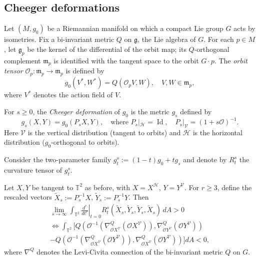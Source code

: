 \documentclass[graybox]{svmult}
\begin{document}
\subsection{Cheeger deformations}

Let $(M,g_0)$ be a Riemannian manifold on which a compact Lie group $G$ acts by isometries. Fix a bi-invariant metric $Q$ on $\mathfrak{g}$, the Lie algebra of $G$. For each $p \in M$, let $\mathfrak{g}_p$ be the kernel of the differential of the orbit map; its $Q$-orthogonal complement $\mathfrak{m}_p$ is identified with the tangent space to the orbit $G\cdot p$. The \emph{orbit tensor} $\mathcal{O}_p : \mathfrak{m}_p \to \mathfrak{m}_p$ is defined by
\[
g_0(V^*, W^*) = Q(\mathcal{O}_p V, W), \quad V,W \in \mathfrak{m}_p,
\]
where $V^*$ denotes the action field of $V$.

For $s \geq 0$, the \emph{Cheeger deformation} of $g_0$ is the metric $g_s$ defined by
\[
g_s(X,Y) = g_0(P_s X, Y), \quad \text{where } P_s|_{\mathcal{H}} = \operatorname{Id}, \quad P_s|_{\mathcal{V}} = (1 + s \mathcal{O})^{-1}.
\]
Here $\mathcal{V}$ is the vertical distribution (tangent to orbits) and $\mathcal{H}$ is the horizontal distribution ($g_0$-orthogonal to orbits).

Consider the two-parameter family $g_t^s := (1-t)g_0 + t g_s$ and denote by $R_t^s$ the curvature tensor of $g_t^s$.

\begin{proposition}\label{prop:CD}
Let $X,Y$ be tangent to $\mathbb{T}^2$ as before, with $X = X^{\mathcal{H}}$, $Y = Y^{\mathcal{V}}$. For $r \geq 3$, define the rescaled vectors $\tilde{X}_s := P_s^{-1}X$, $\tilde{Y}_s := P_s^{-1}Y$. Then
\begin{multline*}
\lim_{s\to\infty} \int_{\mathbb{T}^2} \left.\frac{d^r}{dt^r}\right|_{t=0} R_t^s(\tilde{X}_s, \tilde{Y}_s, \tilde{Y}_s, \tilde{X}_s) \, dA > 0 \\
\Longleftrightarrow \int_{\mathbb{T}^2} \Big[ Q\!\left(\mathcal{O}^{-1}(\nabla^Q_{\mathcal{O} X^{\mathcal{V}}} (\mathcal{O} X^{\mathcal{V}})), \nabla^Q_{\mathcal{O} Y^{\mathcal{V}}} (\mathcal{O} Y^{\mathcal{V}})\right) \\
- Q\!\left(\mathcal{O}^{-1}(\nabla^Q_{\mathcal{O} X^{\mathcal{V}}} (\mathcal{O} Y^{\mathcal{V}})), \nabla^Q_{\mathcal{O} X^{\mathcal{V}}} (\mathcal{O} Y^{\mathcal{V}})\right) \Big] dA < 0,
\end{multline*}
where $\nabla^Q$ denotes the Levi-Civita connection of the bi-invariant metric $Q$ on $G$.
\end{proposition}
\end{document}

